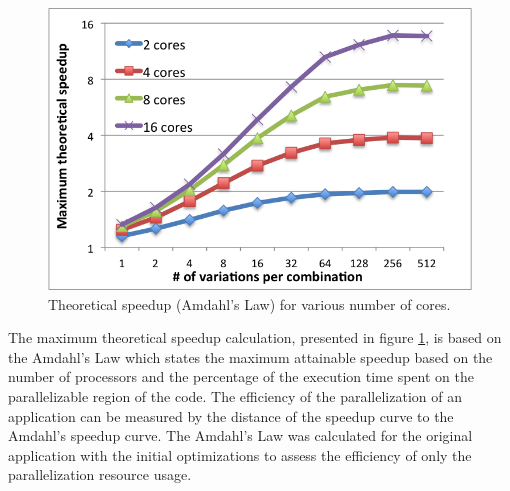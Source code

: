 \begin{figure}[!htp]
	\begin{center}
		\includegraphics[scale=0.7]{../../common/graphs/amdahl_speedup.png}
		\caption{Theoretical speedup (Amdahl's Law) for various number of cores.}
		\label{fig:AmdahlSpeedup}
	\end{center}
\end{figure}

The maximum theoretical speedup calculation, presented in figure \ref{fig:AmdahlSpeedup}, is based on the Amdahl's Law \cite{AMDAHL} which states the maximum attainable speedup based on the number of processors and the percentage of the execution time spent on the parallelizable region of the code. The efficiency of the parallelization of an application can be measured by the distance of the speedup curve to the Amdahl's speedup curve. The Amdahl's Law was calculated for the original application with the initial optimizations to assess the efficiency of only the parallelization resource usage.

